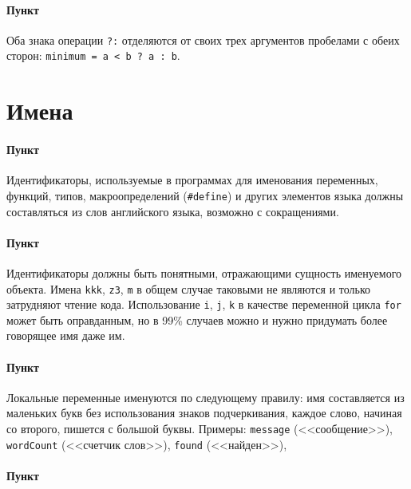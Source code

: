 \paragraph{Пункт}

Оба знака операции \texttt{?:} отделяются от своих трех аргументов
пробелами с обеих сторон:
\texttt{minimum\ =\ a\ \textless{}\ b\ ?\ a\ :\ b}.


\section{Имена}


\paragraph{Пункт}

Идентификаторы, используемые в программах для именования переменных,
функций, типов, макроопределений (\texttt{\#define}) и других элементов
языка должны составляться из слов английского языка, возможно с
сокращениями.

\paragraph{Пункт}

Идентификаторы должны быть понятными, отражающими сущность именуемого
объекта. Имена \verb|kkk|, \verb|z3|, \verb|m| в общем случае таковыми не
являются и только затрудняют чтение кода. Использование \verb|i|, \verb|j|,
\verb|k| в качестве переменной цикла \texttt{for} может быть оправданным,
но в 99\% случаев можно и нужно придумать более говорящее имя даже им.

\paragraph{Пункт}

Локальные переменные именуются по следующему правилу: имя составляется
из маленьких букв без использования знаков подчеркивания, каждое слово,
начиная со второго, пишется с большой буквы. Примеры: \texttt{message}
(<<сообщение>>), \texttt{wordCount} (<<счетчик слов>>), \texttt{found}
(<<найден>>),

\paragraph{Пункт}

